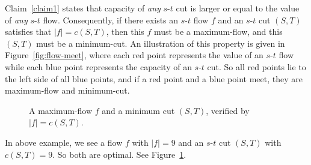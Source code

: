 Claim~\ref{claim1} states that capacity of \emph{any} $s$-$t$ cut
is larger or equal to the value of \emph{any} $s$-$t$ flow.
Consequently, if there exists an $s$-$t$ flow $f$ and an $s$-$t$ cut $(S,T)$
satisfies that $|f| = c(S, T)$, then this $f$ must be a maximum-flow,
and this $(S, T)$ must be a minimum-cut.
An illustration of this property is given in Figure~\ref{fig:flow-meet},
where each red point represents the value of an $s$-$t$ flow
while each blue point represents the capacity of an $s$-$t$ cut.
So all red points lie to the left side of all blue points,
and if a red point and a blue point meet, they are maximum-flow and minimum-cut.


\begin{figure}[h]
\centering{}
\caption{A maximum-flow $f$ and a minimum cut $(S, T)$, verified by $|f| = c(S,T)$.}
\label{fig:maxflow-mincut}
\end{figure}

In above example, we see a flow $f$ with $|f| = 9$ and an $s$-$t$ cut $(S, T)$ with $c(S, T) = 9$.
So both are optimal. See Figure~\ref{fig:maxflow-mincut}.

